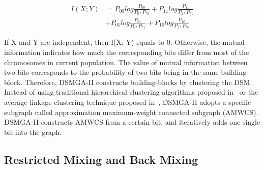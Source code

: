 \documentclass{sig-alternate-05-2015}
\begin{document}
\begin{equation} 
\begin{split}
I(X;Y) &= P_{00 }log\frac{P_{00}}{P_{0*} P_{*0}} + P_{11 }log\frac{P_{11}}{P_{1*} P_{*1}}  \\
	    &+ P_{01 }log\frac{P_{01}}{P_{0*} P_{*1}} + P_{10 }log\frac{P_{10}}{P_{1*} P_{*0}}  
\end{split}
\end{equation}


If X and Y are independent, then I(X; Y) equals to 0.
Otherwise, the mutual information indicates how much the corresponding bits differ from most of the chromosomes in current population.
The value of mutual information between two bits corresponds to the probability of two bits being in the same building-block.
Therefore, DSMGA-II constructs building-blocks by clustering the DSM.
Instead of using traditional hierarchical clustering algorithms proposed in~\cite{thierens:LTGA} or the average linkage clustering technique proposed in~\cite{thierens:OM}, DSMGA-II adopts a specific subgraph called approximation maximum-weight connected subgraph (AMWCS).
DSMGA-II constructs AMWCS from a certain bit,  and iteratively adds one single bit into the graph.






\subsection{Restricted Mixing and Back Mixing}
\end{document}
